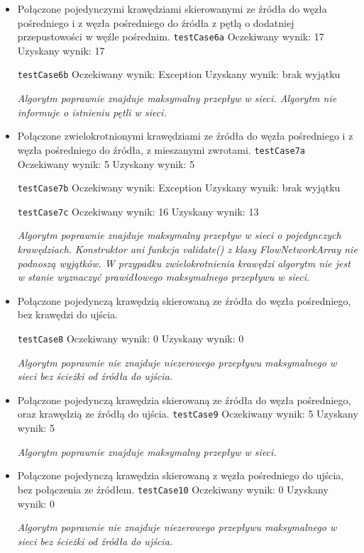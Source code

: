 \begin{itemize}[nosep]
    \item Połączone pojedynczymi krawędziami skierowanymi ze źródła do węzła
    pośredniego i z węzła pośredniego do źródła z pętlą o dodatniej
    przepustowości w węźle pośrednim.
    \texttt{testCase6a}
    Oczekiwany wynik: 17
    Uzyskany wynik: 17

    \texttt{testCase6b}
    Oczekiwany wynik: Exception
    Uzyskany wynik: brak wyjątku

    \emph{Algorytm poprawnie znajduje maksymalny przepływ w sieci. Algorytm nie informuje o istnieniu pętli w sieci.}

    \item Połączone zwielokrotnionymi krawędziami ze źródła do węzła pośredniego
    i z węzła pośredniego do źródła, z mieszanymi zwrotami.
    \texttt{testCase7a}
    Oczekiwany wynik: 5
    Uzyskany wynik: 5

    \texttt{testCase7b}
    Oczekiwany wynik: Exception
    Uzyskany wynik: brak wyjątku

    \texttt{testCase7c}
    Oczekiwany wynik: 16
    Uzyskany wynik: 13

    \emph{Algorytm poprawnie znajduje maksymalny przepływ w sieci o pojedynczych krawędziach. Konstruktor ani funkcja validate() z klasy FlowNetworkArray nie podnoszą wyjątków. W przypadku zwielokrotnienia krawędzi algorytm nie jest w stanie wyznaczyć prawidłowego maksymalnego przepływu w sieci.}

    \item Połączone pojedynczą krawędzią skierowaną ze źródła do węzła
    pośredniego, bez krawędzi do ujścia.

    \texttt{testCase8}
    Oczekiwany wynik: 0
    Uzyskany wynik: 0

    \emph{Algorytm poprawnie nie znajduje niezerowego przepływu maksymalnego w sieci bez ścieżki od źródła do ujścia.}

    \item Połączone pojedynczą krawędzia skierowaną ze źródła do węzła
    pośredniego, oraz krawędzią ze źródłą do ujścia.
    \texttt{testCase9}
    Oczekiwany wynik: 5
    Uzyskany wynik: 5

    \emph{Algorytm poprawnie znajduje maksymalny przepływ w sieci.}

    \item Połączone pojedynczą krawędzia skierowaną z węzła pośredniego do
    ujścia, bez połączenia ze źródłem.
    \texttt{testCase10}
    Oczekiwany wynik: 0
    Uzyskany wynik: 0

    \emph{Algorytm poprawnie nie znajduje niezerowego przepływu maksymalnego w sieci bez ścieżki od źródła do ujścia.}
\end{itemize}


